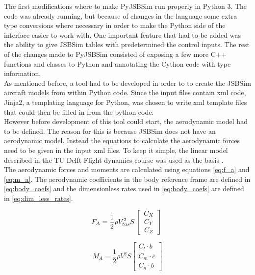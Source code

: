 The first modifications where to make PyJSBSim run properly in Python 3. The code was already running, but because of changes in the language some extra type conversions where necessary in order to make the Python side of the interface easier to work with. One important feature that had to be added was the ability to give JSBSim tables with predetermined the control inputs. The rest of the changes made to PyJSBSim consisted of exposing a few more C++ functions and classes to Python and annotating the Cython code with type information.\\

As mentioned before, a tool had to be developed in order to to create the JSBSim aircraft models from within Python code. Since the input files contain \gls{xml} code, Jinja2, a templating language for Python, was chosen to write \gls{xml} template files that could then be filled in from the python code. \\

However before development of this tool could start, the aerodynamic model had to be defined. The reason for this is because JSBSim does not have an aerodynamic model. Instead the equations to calculate the aerodynamic forces need to be given in the input \gls{xml} files. To keep it simple, the linear model described in the TU Delft Flight dynamics course was used as the basis \cite{fdreader}. \\

The aerodynamic forces and moments are calculated using equations \autoref{eq:f_a} and \autoref{eq:m_a}. The aerodynamic coefficients in the body reference frame are defined in \autoref{eq:body_coefs} and the dimensionless rates used in \autoref{eq:body_coefs} are defined in \autoref{eq:dim_less_rates}.

\begin{equation}
\label{eq:f_a}
{F_A} = \frac{1}{2}\rho V_{tas}^2S\left[ {\begin{array}{*{20}{c}}
{{C_X}}\\
{{C_Y}}\\
{{C_Z}}
\end{array}} \right]\\
\end{equation}

\begin{equation}
\label{eq:m_a}
{M_A} = \frac{1}{2}\rho {V^2}S\left[ {\begin{array}{*{20}{c}}
{{C_l} \cdot b}\\
{{C_m} \cdot \bar c}\\
{{C_n} \cdot b}
\end{array}} \right]
\end{equation}

